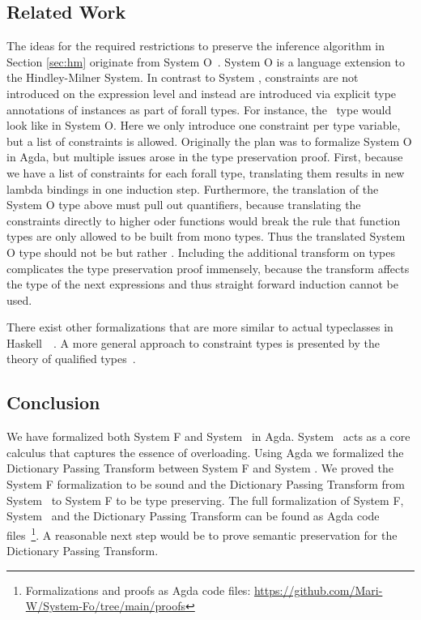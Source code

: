 \subsection{Related Work}
The ideas for the required restrictions to preserve the inference algorithm in Section \ref{sec:hm} originate from System O~\cite{syso}. 
System O is a language extension to the Hindley-Milner System. 
In contrast to System \Fo, constraints are not introduced on the expression level and instead are introduced via explicit type annotations of instances as part of forall types. 
For instance, the \HMo\ type  would look like  in System O. 
Here we only introduce one constraint per type variable, but a list of constraints is allowed. 
Originally the plan was to formalize System O in Agda, but multiple issues arose in the type preservation proof. 
First, because we have a list of  constraints for each forall type, translating them results in  new lambda bindings in one induction step. 
Furthermore, the translation of the System O type above must pull out quantifiers, because translating the constraints directly to higher oder functions would break the rule that function types are only allowed to be built from mono types. 
Thus the translated System O type should not be  but rather . Including the additional transform on types complicates the type preservation proof immensely, because the transform affects the type of the next  expressions and thus straight forward induction cannot be used.

\noindent There exist other formalizations that are more similar to actual typeclasses in Haskell~\cite{ahp}~\cite{tc}. A more general approach to constraint types is presented by the theory of qualified types~\cite{qt}.

\subsection{Conclusion}
We have formalized both System F and System \Fo\ in Agda. 
System \Fo\ acts as a core calculus that captures the essence of overloading.
Using Agda we formalized the Dictionary Passing Transform between System F and System \Fo. 
We proved the System F formalization to be sound and the Dictionary Passing Transform from System \Fo\ to System F to be type preserving. The full formalization of System F, System \Fo\ and the Dictionary Passing Transform can be found as Agda code files~\footnote{Formalizations and proofs as Agda code files: \url{https://github.com/Mari-W/System-Fo/tree/main/proofs}}.
A reasonable next step would be to prove semantic preservation for the Dictionary Passing Transform. 